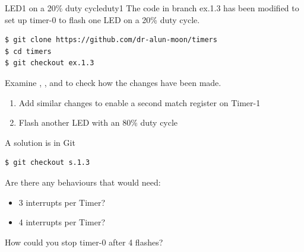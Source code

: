 \documentclass[a4paper]{tufte-handout}
\begin{document}
\begin{exercise}{LED1 on a 20\% duty cycle}{duty1}
The code in branch ex.1.3 has been modified to set up timer-0 to flash
one LED on a 20\% duty cycle.
\begin{verbatim}
$ git clone https://github.com/dr-alun-moon/timers
$ cd timers
$ git checkout ex.1.3
\end{verbatim}
Examine , , and  to check how
the changes have been made.

\begin{enumerate}
\item Add similar changes to enable a second match register on Timer-1
\item Flash another LED with an 80\% duty cycle
\end{enumerate}
\begin{tcolorbox}[colframe=red!50!black,title=Solution]
A solution is in Git 
\begin{verbatim}
$ git checkout s.1.3
\end{verbatim}
\end{tcolorbox}
\end{exercise}

\begin{question}{}{}
  Are there any behaviours that would need:
  \begin{itemize}
  \item 3 interrupts per Timer?
  \item 4 interrupts per Timer?
  \end{itemize}
\end{question}

\begin{question}{}{}
  How could you stop timer-0 after 4 flashes?
\end{question}




\clearpage
\appendix
\end{document}
